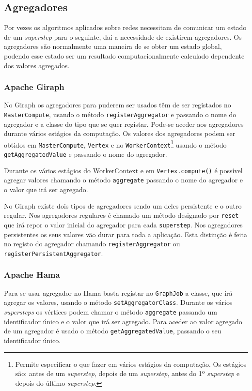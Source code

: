 \newpage

\subsection{Agregadores}
\label{ss:agreg}
  Por vezes os algoritmos aplicados sobre redes necessitam de comunicar um 
estado de um \textit{superstep} para o seguinte, daí a necessidade de existirem 
agregadores. Os agregadores são normalmente uma maneira de se obter um estado 
global, podendo esse estado ser um resultado computacionalmente calculado 
dependente dos valores agregados.

  \subsubsection*{Apache Giraph}
    No Giraph os agregadores para puderem ser usados têm de ser registados no 
\texttt{MasterCompute}, usando o método \texttt{registerAggregator} e
    passando o nome do agregador e a classe do tipo que se quer registar. 
Pode-se aceder aos agregadores durante vários estágios da computação.
    Os valores dos agregadores podem ser obtidos em \texttt{MasterCompute}, 
\texttt{Vertex} e no \texttt{WorkerContext}\footnote{Permite 
especificar o que fazer em vários estágios da computação. Os estágios são: 
antes de um \textit{superstep}, depois de um \textit{superstep}, antes do 1º \textit{superstep} e depois do 
último \textit{superstep}.} usando o método \texttt{getAggregatedValue} e 
passando
    o nome do agregador.
    
    Durante os vários estágios do WorkerContext e em \texttt{Vertex.compute()} é possível agregar valores chamando o 
método \texttt{aggregate} passando o nome do agregador e o valor que irá ser agregado.
    
    No Giraph existe dois tipos de agregadores sendo um deles persistente e o 
outro regular. Nos agregadores regulares é chamado um método
    designado por \texttt{reset} que irá repor o valor inicial do agregador 
para cada \texttt{superstep}. Nos agregadores persistentes os seus valores vão 
durar
    para toda a aplicação. Esta distinção é feita no registo do agregador chamando \texttt{registerAggregator} 
    ou \texttt{registerPersistentAggregator}.
    
  \subsubsection*{Apache Hama}
    Para se usar agregador no Hama basta registar no \texttt{GraphJob} a classe, que irá agregar os valores, usando o método
    \texttt{setAggregatorClass}. Durante os vários \textit{supersteps} os 
vértices podem chamar o método \texttt{aggregate} passando um identificador 
único
    e o valor que irá ser agregado. Para aceder ao valor agregado de um 
agregador é usado o método \texttt{getAggregatedValue}, passando o seu 
    identificador único.
    
